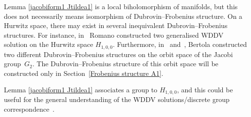 \documentclass[10pt,a4paper]{amsart}
\numberwithin{equation}{section}
\begin{document}
\begin{Remark}
Lemma \ref{jacobiform1 Jtildea1} is a local biholomorphism of manifolds, but this does not neces\-sa\-rily means isomorphism of Dubrovin--Frobenius structure. On a Hurwitz space, there may exist in several inequivalent Dubrovin--Frobenius structures. For instance, in~\cite{Romano2} Romano constructed two gene\-ra\-li\-sed WDDV solution on the Hurwitz space $H_{1,0,0}$. Furthermore, in~\cite{BertolaM.1} and~\cite{BertolaM.2}, Bertola constructed two different Dubrovin--Frobenius structures on the orbit space of the Jacobi group~$G_2$. The Dubrovin--Frobenius structure of this orbit space will be constructed only in Section~\ref{Frobenius structure A1}.
\end{Remark}

\begin{Remark}
Lemma \ref{jacobiform1 Jtildea1} associates a group to $H_{1,0,0}$, and this could be useful for the general understanding of the WDDV solutions/discrete group correspondence~\cite{B.Dubrovin2}.
\end{Remark}
\end{document}
